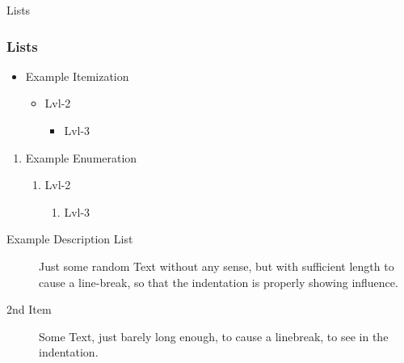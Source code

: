 \begin{frame}{Lists}
	\frametitle{Lists}
	\begin{minipage}[t]{0.48\linewidth}
		\begin{itemize}
		\item Example Itemization
			\begin{itemize}
			\item%
				Lvl-2
				\begin{itemize}
				\item%
					Lvl-3
				\end{itemize}
			\end{itemize}
		\end{itemize}
	\end{minipage}
	\hfill
	\begin{minipage}[t]{0.48\linewidth}
		\begin{enumerate}
		\item Example Enumeration
			\begin{enumerate}
			\item%
				Lvl-2
				\begin{enumerate}
				\item%
					Lvl-3
				\end{enumerate}
			\end{enumerate}
		\end{enumerate}
	\end{minipage}
	
	\begin{description}
	\item[Example Description List]%
		Just some random Text without any sense, but with sufficient length to cause a line-break, so that the indentation is properly showing influence.
	\item[2nd Item] Some Text, just barely long enough, to cause a linebreak, to see in the indentation.
	\end{description}
\end{frame}


